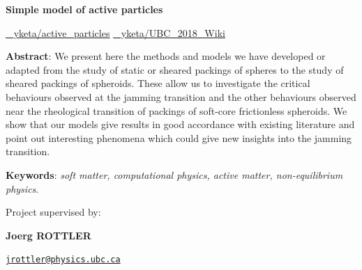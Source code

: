 \documentclass[class=report, float=false, crop=false]{standalone}
\begin{document}
\begin{center}


\vspace{1.5cm}

\textbf{\Huge Simple model of active particles}
\vspace{0.3cm}
\begin{center}
\begin{minipage}{0.7\linewidth}
\href{https://github.com/yketa/active_particles}{{\large \faGithub~ yketa/active\_particles}}
\hfill\href{https://github.com/yketa/UBC_2018_Wiki}{{\large \faGithub~ yketa/UBC\_2018\_Wiki}}
\end{minipage}
\end{center}


\vspace{1cm}

\parbox{15cm}{\small
\textbf{Abstract}: We present here the methods and models we have developed or adapted from the study of static or sheared packings of spheres to the study of sheared packings of spheroids. These allow us to investigate the critical behaviours observed at the jamming transition and the other behaviours observed near the rheological transition of packings of soft-core frictionless spheroids. We show that our models give results in good accordance with existing literature and point out interesting phenomena which could give new insights into the jamming transition.
}

\vspace{0.5cm}
\parbox{15cm}{
\textbf{Keywords}: {\it soft matter, computational physics, active matter, non-equilibrium physics}.
}

\vspace{0.5cm}


\parbox{15cm}{

\begin{center}

{\small Project supervised by:}

\vspace{0.4cm}

\begin{minipage}{0.5\textwidth}
\centering

{\bf Joerg ROTTLER}

\href{mailto:jrottler@physics.ubc.ca}{\tt jrottler@physics.ubc.ca} \\


\end{minipage}
\end{center}}
\end{center}
\end{document}
